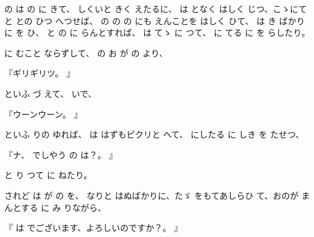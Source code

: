 
の
は
の
に
きて、
しくいと
きく
えたるに、
は
となく
はしく
じつ、こゝにて
と
との
ひつ
へつせば、
の
の
の
にも
えんことを
はしく
ひて、
は
き
ばかりに
を
ひ、
と
の
に
らんとすれば、
は
てゝ
に
つて、
に
てる
に
を
らしたり。

に
むこと
ならずして、
の
お
が
の
より、

『ギリギリツ。
』

といふ
づ
えて、
いで、

『ウーンウーン。
』

といふ
りの
ゆれば、
は
はずもピクリと
へて、
にしたる
に
しき
を
たせつ、

『ナ、
でしやう
の
は？。
』

と
り
つて
に
ねたり。

されど
は
が
の
を、
なりと
はぬばかりに、たゞ
をもてあしらひ
て、おのが
まんとする
に
み
りながら、

『
は
でございます、よろしいのですか？。
』

